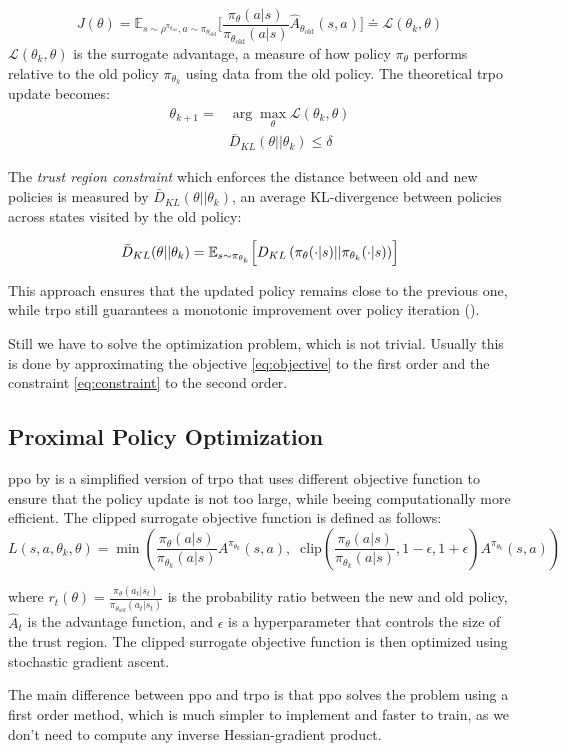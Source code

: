 $$J(\theta) = \mathbb{E}_{s \sim \rho^{\pi_{\theta_\text{old}}}, a \sim \pi_{\theta_\text{old}}} \big[ \frac{\pi_\theta(a \vert s)}{\pi_{\theta_\text{old}}(a \vert s)} \hat{A}_{\theta_\text{old}}(s, a) \big] \doteq {\mathcal L}(\theta_k, \theta)$$
${\mathcal L}(\theta_k, \theta)$ is the surrogate advantage, a measure of how policy $\pi_{\theta}$ performs relative to the old policy $\pi_{\theta_k}$ using data from the old policy.
The theoretical \gls{trpo} update becomes:
\begin{align}
    \theta_{k+1} =& \arg \max_{\theta}{\mathcal L}(\theta_k, \theta)  \label{eq:objective}\\ 
    & \bar{D}_{KL}(\theta || \theta_k) \leq \delta \label{eq:constraint}
\end{align}

The \emph{trust region constraint} which enforces the distance between old and new policies is 
measured by $\bar{D}_{KL}(\theta || \theta_k)$, an average KL-divergence between policies across 
states visited by the old policy:

$$\bar{D}_{KL}(\theta || \theta_k) = \mathbb{E}_{s \sim \pi_{\theta_k}}\Bigl[D_{KL}\left(\pi_{\theta}(\cdot|s) || \pi_{\theta_k} (\cdot|s) \right)\Bigr]$$

This approach ensures that the updated policy remains close to the previous one, 
while \gls{trpo} still guarantees a monotonic improvement over policy iteration (\cite{schulman2017trustregionpolicyoptimization}).

Still we have to solve the optimization problem, which is not trivial. Usually this is done by 
approximating the objective \ref{eq:objective} to the first order and the constraint \ref{eq:constraint} to the second order.

\subsection{Proximal Policy Optimization}
\gls{ppo} by \cite{schulman2017proximalpolicyoptimizationalgorithms} is a simplified version of \gls{trpo} that 
uses different objective function to ensure that the policy update is not too large, while beeing 
computationally more efficient. 
The clipped surrogate objective function is defined as follows:
$$L(s,a,\theta_k,\theta) = \min\left( \frac{\pi_{\theta}(a|s)}{\pi_{\theta_k}(a|s)} A^{\pi_{\theta_k}}(s,a), \;\; \text{clip}\left(\frac{\pi_{\theta}(a|s)}{\pi_{\theta_k}(a|s)}, 1 - \epsilon, 1+\epsilon \right) A^{\pi_{\theta_k}}(s,a) \right)$$

where $r_t(\theta) = \frac{\pi_\theta(a_t|s_t)}{\pi_{\theta_{old}}(a_t|s_t)}$ is the probability ratio 
between the new and old policy, $\hat{A}_t$ is the advantage function, and $\epsilon$ is a 
hyperparameter that controls the size of the trust region. The clipped surrogate objective function 
is then optimized using stochastic gradient ascent.

The main difference between \gls{ppo} and \gls{trpo} is
that \gls{ppo} solves the problem using a first order method, which is much
simpler to implement and faster to train, as we don't need to compute any
inverse Hessian-gradient product. 
